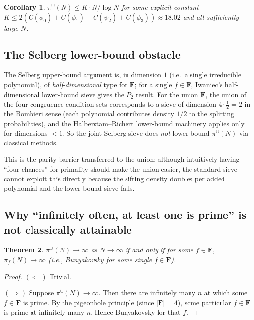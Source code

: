 \documentclass[11pt]{article}
\newtheorem{theorem}{Theorem}[section]
\newtheorem{corollary}[theorem]{Corollary}
\theoremstyle{definition}
\newcommand{\F}{\mathbf{F}}
\newcommand{\F}{\mathcal{F}}
\begin{document}
\begin{corollary}\label{cor:upper}
$\pi^\cup(N)\le K\cdot N/\log N$ for some explicit constant $K\le 2(C(\phi_0)+C(\phi_1)+C(\psi_2)+C(\phi_3))\approx 18.02$ and all sufficiently large $N$.
\end{corollary}

\subsection{The Selberg lower-bound obstacle}

The Selberg upper-bound argument is, in dimension $1$ (i.e.\ a single irreducible polynomial), of \emph{half-dimensional} type for $\F$; for a single $f\in\F$, Iwaniec's \cite{iwaniec1978} half-dimensional lower-bound sieve gives the $P_2$ result. For the union $\F$, the union of the four congruence-condition sets corresponds to a sieve of dimension $4\cdot\frac12=2$ in the Bombieri sense (each polynomial contributes density $1/2$ to the splitting probabilities), and the Halberstam--Richert lower-bound machinery applies only for dimensions $<1$. So the joint Selberg sieve does \emph{not} lower-bound $\pi^\cup(N)$ via classical methods.

This is the parity barrier transferred to the union: although intuitively having ``four chances'' for primality should make the union easier, the standard sieve cannot exploit this directly because the sifting density doubles per added polynomial and the lower-bound sieve fails.

\subsection{Why ``infinitely often, at least one is prime'' is not classically attainable}

\begin{theorem}\label{thm:union-iff-bunyakovsky}
$\pi^\cup(N)\to\infty$ as $N\to\infty$ if and only if for some $f\in\F$, $\pi_f(N)\to\infty$ (i.e., Bunyakovsky for some single $f\in\F$).
\end{theorem}

\begin{proof}
$(\Leftarrow)$ Trivial.

$(\Rightarrow)$ Suppose $\pi^\cup(N)\to\infty$. Then there are infinitely many $n$ at which some $f\in\F$ is prime. By the pigeonhole principle (since $|\F|=4$), some particular $f\in\F$ is prime at infinitely many $n$. Hence Bunyakovsky for that $f$.
\end{proof}
\end{document}
